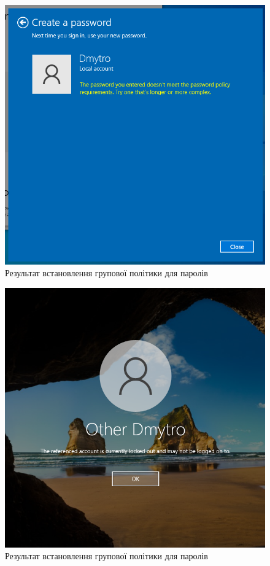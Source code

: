 \documentclass[oneside,14pt]{extarticle}
\begin{document}
\begin{normalsize}
	\begin{figure}[H]
		\centering
		\includegraphics[width=\columnwidth]{2}
		\caption{Результат встановлення групової політики для паролів}
	\end{figure}
	
	\begin{figure}[H]
		\centering
		\includegraphics[width=\columnwidth]{3}
		\caption{Результат встановлення групової політики для паролів}
	\end{figure}
	

\end{normalsize}
\end{document}
